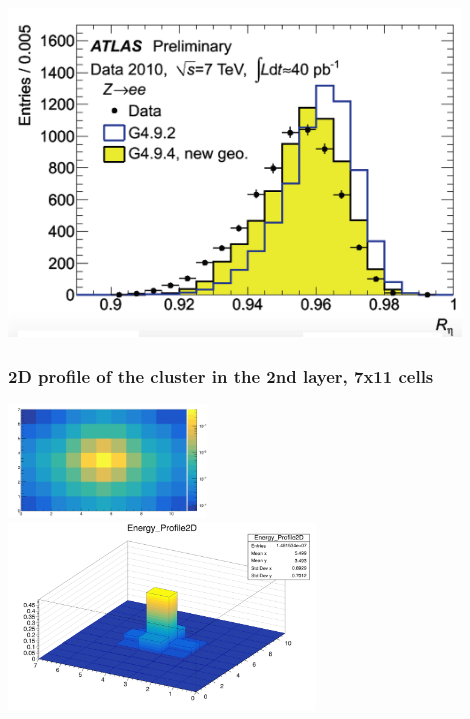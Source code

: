 \documentclass{beamer}
\begin{document}
\begin{frame}
\frametitle{}

\centering
\includegraphics[width=12cm]{G4.png}\\
\end{frame}

\begin{frame}
\frametitle{2D profile of the cluster in the 2nd layer, 7x11 cells }

\centering
\includegraphics[height=3cm]{logscale.png}\\

\includegraphics[height=5cm]{2dProfile.png}\\

\end{frame}
\end{document}
